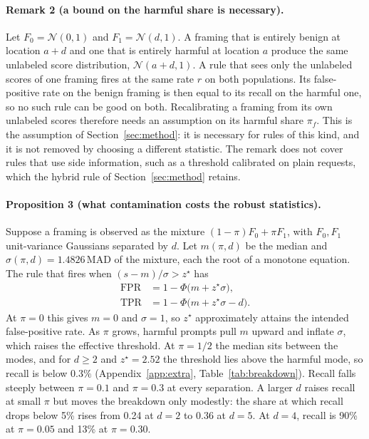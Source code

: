\documentclass[11pt]{article}
\begin{document}
\paragraph{Remark 2 (a bound on the harmful share is necessary).}
Let $F_0=\mathcal N(0,1)$ and $F_1=\mathcal N(d,1)$. A framing that is entirely benign at location $a+d$ and one that is entirely harmful at location $a$ produce the same unlabeled score distribution, $\mathcal N(a+d,1)$. A rule that sees only the unlabeled scores of one framing fires at the same rate $r$ on both populations. Its false-positive rate on the benign framing is then equal to its recall on the harmful one, so no such rule can be good on both. Recalibrating a framing from its own unlabeled scores therefore needs an assumption on its harmful share $\pi_f$. This is the assumption of Section~\ref{sec:method}: it is necessary for rules of this kind, and it is not removed by choosing a different statistic. The remark does not cover rules that use side information, such as a threshold calibrated on plain requests, which the hybrid rule of Section~\ref{sec:method} retains.

\paragraph{Proposition 3 (what contamination costs the robust statistics).}
Suppose a framing is observed as the mixture $(1-\pi)F_0+\pi F_1$, with $F_0,F_1$ unit-variance Gaussians separated by $d$. Let $m(\pi,d)$ be the median and $\sigma(\pi,d)=1.4826\,\mathrm{MAD}$ of the mixture, each the root of a monotone equation. The rule that fires when $(s-m)/\sigma>z^\star$ has
\begin{align*}
\mathrm{FPR}&=1-\Phi\bigl(m+z^\star\sigma\bigr),\\
\mathrm{TPR}&=1-\Phi\bigl(m+z^\star\sigma-d\bigr).
\end{align*}
At $\pi=0$ this gives $m=0$ and $\sigma=1$, so $z^\star$ approximately attains the intended false-positive rate. As $\pi$ grows, harmful prompts pull $m$ upward and inflate $\sigma$, which raises the effective threshold. At $\pi=1/2$ the median sits between the modes, and for $d\ge2$ and $z^\star=2.52$ the threshold lies above the harmful mode, so recall is below $0.3\%$ (Appendix~\ref{app:extra}, Table~\ref{tab:breakdown}). Recall falls steeply between $\pi=0.1$ and $\pi=0.3$ at every separation. A larger $d$ raises recall at small $\pi$ but moves the breakdown only modestly: the share at which recall drops below 5\% rises from 0.24 at $d=2$ to 0.36 at $d=5$. At $d=4$, recall is 90\% at $\pi=0.05$ and 13\% at $\pi=0.30$.
\end{document}
